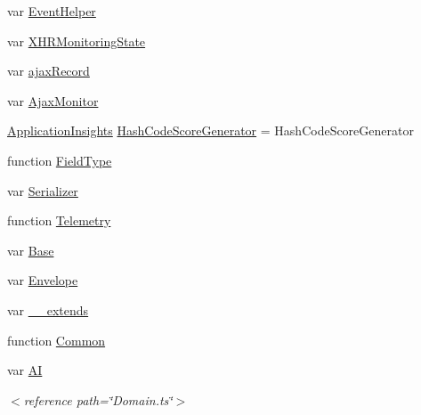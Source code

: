 \begin{DoxyCompactItemize}
\item 
var \hyperlink{obj_2_release_2_package_2_package_tmp_2_scripts_2ai_80_822_89-build00167_8js_ab68a52b33466abbf486cdf84371fca0f}{Event\+Helper}
\item 
var \hyperlink{obj_2_release_2_package_2_package_tmp_2_scripts_2ai_80_822_89-build00167_8js_a4f771bfa65091853b832d27ff5e9c716}{X\+H\+R\+Monitoring\+State}
\item 
var \hyperlink{obj_2_release_2_package_2_package_tmp_2_scripts_2ai_80_822_89-build00167_8js_a7cd47fdf5f914d968bcb1c0bd808b2a5}{ajax\+Record}
\item 
var \hyperlink{obj_2_release_2_package_2_package_tmp_2_scripts_2ai_80_822_89-build00167_8js_a04e5b115a114a7180491d402b8c7e51b}{Ajax\+Monitor}
\item 
\hyperlink{_scripts_2ai_80_822_89-build00167_8js_aa415ef4f8cdd699689ef4b61db7656d8}{Application\+Insights} \hyperlink{obj_2_release_2_package_2_package_tmp_2_scripts_2ai_80_822_89-build00167_8js_a1712decfcea3323f71212ee873c74ce2}{Hash\+Code\+Score\+Generator} = Hash\+Code\+Score\+Generator
\item 
function \hyperlink{obj_2_release_2_package_2_package_tmp_2_scripts_2ai_80_822_89-build00167_8js_a21475a2b33a5a873fc477ad4b7f274d7}{Field\+Type}
\item 
var \hyperlink{obj_2_release_2_package_2_package_tmp_2_scripts_2ai_80_822_89-build00167_8js_ad312dca62ea45e4d0019b9fe66329a92}{Serializer}
\item 
function \hyperlink{obj_2_release_2_package_2_package_tmp_2_scripts_2ai_80_822_89-build00167_8js_ae256f6f49305d910c46af8e5b9ef950f}{Telemetry}
\item 
var \hyperlink{obj_2_release_2_package_2_package_tmp_2_scripts_2ai_80_822_89-build00167_8js_abc90faad356138d0991872b4e65ecf20}{Base}
\item 
var \hyperlink{obj_2_release_2_package_2_package_tmp_2_scripts_2ai_80_822_89-build00167_8js_a9823f9c23669cb68ab0acbfa8d2180a7}{Envelope}
\item 
var \hyperlink{obj_2_release_2_package_2_package_tmp_2_scripts_2ai_80_822_89-build00167_8js_ac09f4951ac4b25df0272d4e78ff85ae0}{\+\_\+\+\_\+extends}
\item 
function \hyperlink{obj_2_release_2_package_2_package_tmp_2_scripts_2ai_80_822_89-build00167_8js_ae319e2563fc7e9273309db9b6dca659f}{Common}
\item 
var \hyperlink{obj_2_release_2_package_2_package_tmp_2_scripts_2ai_80_822_89-build00167_8js_aa840f97564574b54956c385088b90e81}{AI}
\begin{DoxyCompactList}\small\item\em $<$reference path=\char`\"{}\+Domain.\+ts\char`\"{}$>$ \end{DoxyCompactList}\item 

\end{DoxyCompactItemize}
